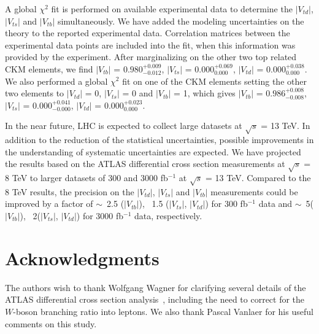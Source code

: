\documentclass[11pt]{article}
\newcommand{\VTD}{|V_{td}|}
\newcommand{\VTS}{|V_{ts}|}
\newcommand{\VTB}{|V_{tb}|}
\begin{document}
A global $\chi^2$  fit is performed on available experimental data to determine the $\VTD$, $\VTS$ and $\VTB$ simultaneously.  We have added  the modeling uncertainties on the theory to the reported experimental data. Correlation matrices between the experimental data points are included into the fit, when this information was provided by the experiment. After marginalizing on the other two top related CKM elements, we find   $|V_{tb}|$ = $0.980^{+0.009}_{-0.012}$, $|V_{ts}|$ = $0.000^{+0.069}_{0.000}$, $|V_{td}|$ = $0.000^{+0.038}_{0.000}$. We also performed a global $\chi^2$  fit on one of the CKM elements setting the other two elements to $\VTD$ = 0, $\VTS$ = 0 and $\VTB$ = 1, which gives $|V_{tb}|$ = $0.986^{+0.008}_{-0.008}$, $|V_{ts}|$ = $0.000^{+0.041}_{-0.000}$, $|V_{td}|$ = $0.000^{+0.023}_{0.000}$.


In the near future, LHC is expected to collect large datasets at $\sqrt{s}$ = 13 TeV. In addition to the reduction of the statistical uncertainties, possible improvements in the understanding of systematic uncertainties are expected.  We have projected the results based on the ATLAS differential cross section measurements at $\sqrt{s}$ = 8 TeV to larger datasets of 300 and 3000 fb$^{-1}$ at $\sqrt{s}$ = 13 TeV. Compared to the 8 TeV results, the precision on the $\VTD$, $\VTS$ and $\VTB$ measurements could be improved  by a factor of $\sim$~2.5 ($\VTB$), ~1.5 ($\VTS$, $\VTD$) for 300 fb$^{-1}$ data and $\sim$~5($\VTB$), ~2($\VTS$, $\VTD$) for 3000 fb$^{-1}$ data, respectively.



\section*{Acknowledgments}

The authors wish to thank Wolfgang Wagner for clarifying several details of the ATLAS differential cross section analysis~\cite{Aaboud:2017pdi}, including the need to correct for the $W$-boson branching ratio into leptons. We also thank Pascal Vanlaer for his useful comments on this study.

{}

\end{document}
